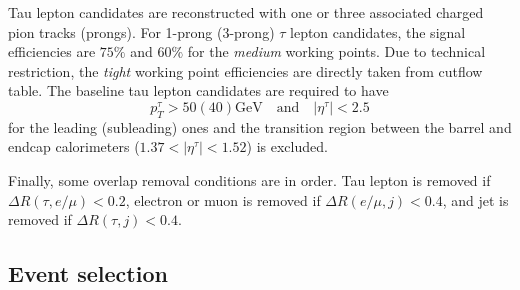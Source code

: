 \documentclass{ws-mpla}
\begin{document}
Tau lepton candidates are reconstructed with one or three associated charged pion tracks (prongs). %
For 1-prong (3-prong) $\tau$ lepton candidates, the signal efficiencies are $75\%$ and $60\%$ for the \textit{medium} working points. Due to technical restriction, the \textit{tight} working point efficiencies are directly taken from cutflow table. %
The baseline tau lepton candidates are required to have 
\begin{equation}
p^{\tau}_T > 50(40) \textrm{GeV}\quad \textrm{and}\quad |\eta^{\tau}| < 2.5
\end{equation}
for the leading (subleading) ones and the transition region between the barrel and endcap calorimeters ($ 1.37 < |\eta^{\tau}| < 1.52 $) is excluded.

Finally, some overlap removal conditions are in order. Tau lepton is removed if $\Delta R(\tau,e/\mu) < 0.2$, electron or muon is removed if $\Delta R(e/\mu,j) < 0.4$, and jet is removed if $\Delta R(\tau,j) < 0.4$.


\subsection{Event selection}

\end{document}
